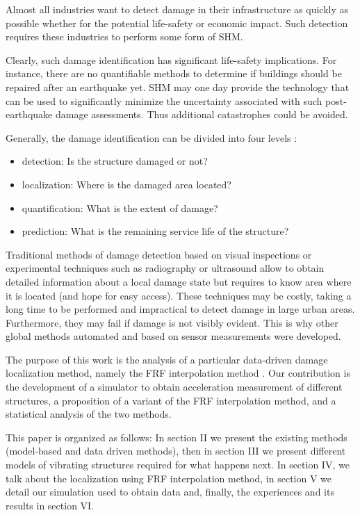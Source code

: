 \documentclass[journal]{IEEEtran}
\begin{document}
Almost all industries want to detect damage in their infrastructure as quickly as possible whether
 for the potential life-safety or economic impact.
Such detection requires these industries to perform some form of SHM.


Clearly, such damage identification has significant life-safety implications.
For instance, there are  no quantifiable methods to
 determine if buildings should be repaired after an earthquake yet.
SHM may one day provide the technology that can be used to significantly minimize
 the uncertainty associated with such post-earthquake damage assessments.
Thus additional catastrophes could be avoided.


Generally, the damage identification can be divided into four levels \cite{peeters2000system}:
\begin{itemize}
\item detection: Is the structure damaged or not?
\item localization: Where is the damaged area located?
\item quantification: What is the extent of damage?
\item prediction: What is the remaining service life of the structure?
\end{itemize}
\vspace{2mm}

Traditional methods of damage detection based on visual inspections or experimental techniques such as radiography
 or ultrasound allow to obtain detailed information about a local damage state but requires to know area where it is located (and hope for easy access).
These techniques may be costly, taking a long time to be performed and impractical to detect damage in large urban areas.
 Furthermore, they may fail if damage is not visibly evident. This is why other global methods automated
 and based on sensor measurements were developed.



The purpose of this work is the analysis of a particular data-driven damage localization method,
 namely the FRF interpolation method \cite{dilena2015damage}. Our contribution is the development of a simulator to obtain acceleration measurement of different structures, a proposition of a variant of the FRF interpolation method, and a statistical analysis of the two methods.

This paper is organized as follows: In section II we  present the existing methods (model-based and data driven methods),
then in section III we present different models of vibrating structures required for what happens next. In section IV,  we talk about the localization using FRF interpolation method, in section V we detail our simulation used to obtain data and, finally, the experiences and its results in section VI.
\end{document}
